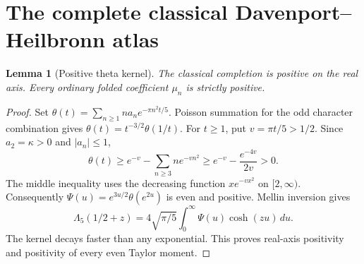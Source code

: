 \documentclass[11pt]{article}
\newtheorem{lemma}[theorem]{Lemma}
\theoremstyle{remark}
\begin{document}
\section{The complete classical Davenport--Heilbronn atlas}
\begin{lemma}[Positive theta kernel]\label{lem:theta}
The classical completion is positive on the real axis. Every ordinary
folded coefficient \(\mu_n\) is strictly positive.
\end{lemma}
\begin{proof}
Set \(\theta(t)=\sum_{n\ge1}na_n e^{-\pi n^2t/5}\).
Poisson summation for the odd character combination gives
\(\theta(t)=t^{-3/2}\theta(1/t)\).
For \(t\ge1\), put \(v=\pi t/5>1/2\). Since \(a_2=\kappa>0\) and
\(|a_n|\le1\),
\begin{equation}\label{eq:thetabound}
 \theta(t)\ge e^{-v}-\sum_{n\ge3}n e^{-vn^2}
 \ge e^{-v}-\frac{e^{-4v}}{2v}>0.
\end{equation}
The middle inequality uses the decreasing function \(x e^{-vx^2}\) on
\([2,\infty)\). Consequently \(\Psi(u)=e^{3u/2}\theta(e^{2u})\) is even and
positive. Mellin inversion gives
\begin{equation}\label{eq:thetamellin}
 \Lambda_5(1/2+z)=4\sqrt{\pi/5}\int_0^\infty\Psi(u)\cosh(zu)\,du.
\end{equation}
The kernel decays faster than any exponential. This proves real-axis
positivity and positivity of every even Taylor moment.
\end{proof}
\end{document}
